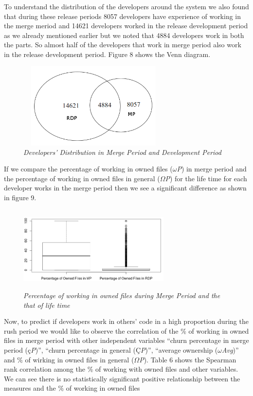 \documentclass{acm_proc_article-sp}
\begin{document}
To understand the distribution of the developers around the system we also found that during these release periods 8057 developers have experience of working in the merge meriod and 14621 developers worked in the release development period as we already mentioned earlier but we noted that 4884 developers work in both the parts. So almost half of the developers that work in merge period also work in the release development period. Figure 8 shows the Venn diagram.
\begin{figure}
\begin{center}
\includegraphics[height=1.7in,width=3in]{devDistMPRDP.png}
\caption{\small \sl Developers' Distribution in Merge Period and Development Period}
\end{center}
\end{figure}

If we compare the percentage of working in owned files ($\omega$\textit{P}) in merge period and the percentage of working in owned files in general ($\Omega$\textit{P}) for the life time for each developer works in the merge period then we see a significant difference as shown in figure 9.
\begin{figure}
\begin{center}
\includegraphics[height=1.7in,width=3in]{ownedFilesMPRDPBox.png}
\caption{\small \sl Percentage of working in owned files during Merge Period and the that of life time}
\end{center}
\end{figure}

Now, to predict if developers work in others' code in a high proportion during the rush period we would like to observe the correlation of the \% of working in owned files in merge period with other independent variables ``churn percentage in merge period (\c{c}\textit{P})'', ``churn percentage in general (\c{C}\textit{P})'', ``average ownership ($\omega$\textit{Avg})'' and \% of wirking in owned files in general ($\Omega$\textit{P}). Table 6 shows the Spearman rank correlation among the \% of working with owned files and other variables. We can see there is no statistically significant positive relationship between the measures and the \% of working in owned files 
\end{document}
